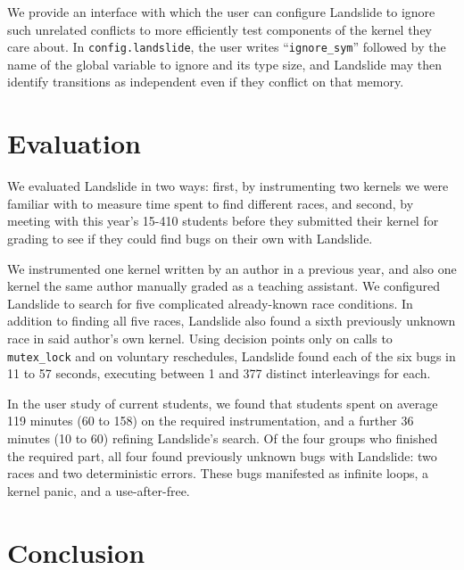 \documentclass{llncs}
\begin{document}
We provide an interface with which the user can configure Landslide to ignore such unrelated conflicts to more efficiently test components of the kernel they care about. In \texttt{config.landslide}, the user writes ``\texttt{ignore\_sym}'' followed by the name of the global variable to ignore and its type size, and Landslide may then identify transitions as independent even if they conflict on that memory.

\squish
\section{Evaluation}
\squish

We evaluated Landslide in two ways: first, by instrumenting two kernels we were familiar with to measure time spent to find different races, and second, by meeting with this year's 15-410 students before they submitted their kernel for grading to see if they could find bugs on their own with Landslide.

We instrumented one kernel written by an author in a previous year, and also one kernel the same author manually graded as a teaching assistant. We configured Landslide to search for five complicated already-known race conditions. In addition to finding all five races, Landslide also found a sixth previously unknown race in said author's own kernel. Using decision points only on calls to \texttt{mutex\_lock} and on voluntary reschedules, Landslide found each of the six bugs in 11 to 57 seconds, executing between 1 and 377 distinct interleavings for each.

In the user study of current students, we found that students spent on average 119 minutes (60 to 158) on the required instrumentation, and a further 36 minutes (10 to 60) refining Landslide's search. Of the four groups who finished the required part, all four found previously unknown bugs with Landslide: two races and two deterministic errors. These bugs manifested as infinite loops, a kernel panic, and a use-after-free.

\squish
\section{Conclusion}
\squish
\end{document}
